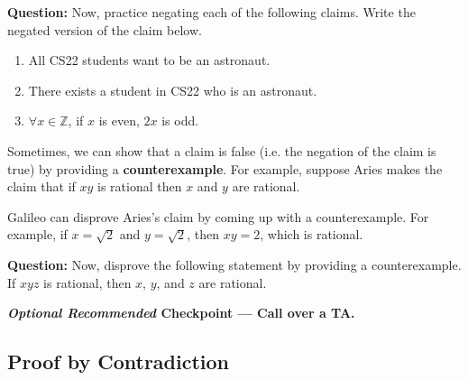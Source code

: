 \documentclass[12pt,letterpaper]{article}
\newcommand\Z{\mathbb Z}
\newif\ifsol
\begin{document}
      \ifsol
		\textbf{Answer:} b
	 	\else
      \fi

      \textbf{Question:} Now, practice negating each of the following claims. Write the negated version of the claim below.

     \begin{enumerate}
        \item All CS22 students want to be an astronaut.
        \item There exists a student in CS22 who is an astronaut.
        \item $\forall x \in \Z$, if $x$ is even, $2x$ is odd.
      \end{enumerate}
      
      \ifsol
		\textbf{Answer Key:}
		 \begin{enumerate}
        \item There exists a student in CS22 who does not want to be an astronaut.
        \item All students in CS22 are not astronauts. \textbf{Be sure to note the different between NOT all students are and ALL students are not.}
        \item There exists an $x \in \Z$ such that if $x$ is even, $2x$ is not odd.
        
      \end{enumerate}
	 	\else
      \fi

      Sometimes, we can show that a claim is false (i.e. the negation of the claim is true) by providing a \textbf{counterexample}. For example, suppose Aries makes the claim that if $xy$ is rational then $x$ and $y$ are rational.

      Galileo can disprove Aries's claim by coming up with a counterexample. For example, if $x = \sqrt{2}$ and $y = \sqrt{2}$, then $xy = 2$, which is rational. 

      \textbf{Question:} Now, disprove the following statement by providing a counterexample.
      If $xyz$ is rational, then $x$, $y$, and $z$ are rational.

        \begin{mdframed}
		\ifsol
		Consider $x = \sqrt{2}$, $y = \sqrt{3}$, $z = \sqrt{6}$. $xyz = 6$ which is rational.
		\else
        \vspace{4cm}
		\fi
        \end{mdframed}

\textbf{\textit{Optional Recommended} Checkpoint — Call over a TA.}
\newpage

      \subsection*{Proof by Contradiction}
\end{document}
